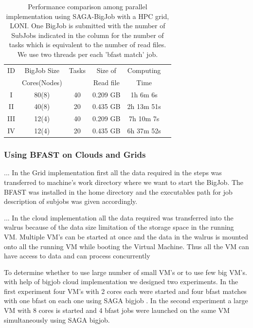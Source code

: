 \documentclass{acm_proc_article-sp}
\begin{document}
 \begin{table}


 \begin{tabular}{|ccccc|c |} 
 \hline 
ID & BigJob Size  &  Tasks & Size of    &  Computing  \\
   & Cores(Nodes) &  & Read file &  Time\\\hline
I   & 80(8) &  40 & 0.209 GB &  1h 6m 6s \\
II  & 40(8)  &  20 & 0.435 GB & 2h 13m 51s\\
III & 12(4)  & 40  & 0.209 GB &  7h 10m 7s \\
IV & 12(4)  & 20 & 0.435 GB & 6h 37m 52s  \\
\hline
\end{tabular}
\caption{Performance comparison among parallel implementation using
  SAGA-BigJob with a HPC grid, LONI. One BigJob is submitted with the
  number of SubJobs indicated in the column for the number of tasks
  which is equivalent to the number of read files. We use two threads per each 'bfast 
  match' job.  }
  \label{table:bigjob-loni} 
\end{table}


\subsubsection{Using BFAST on Clouds and Grids}

...  In the Grid implementation first all the
data required in the steps was transferred to machine's work directory
where we want to start the BigJob. The BFAST was installed in the home
directory and the executables path for job description of subjobs was
given accordingly.

...  In the cloud implementation all the data
required was transferred into the walrus because of the data size
limitation of the storage space in the running VM. Multiple VM's can
be started at once and the data in the walrus is mounted onto all the
running VM while booting the Virtual Machine. Thus all the VM can have
access to data and can process concurrently


To determine whether to use large number of small VM's or to use few
big VM's. with help of bigjob cloud implementation we designed two
experiments. In the first experiment four VM's with 2 cores each were
started and four bfast matches with one bfast on each one using SAGA
bigjob . In the second experiment a large VM with 8 cores is started
and 4 bfast jobs were launched on the same VM simultaneously using
SAGA bigjob.
\end{document}
